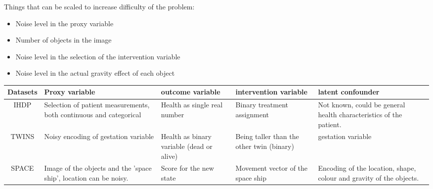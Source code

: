 \documentclass{article}
\begin{document}
Things that can be scaled to increase difficulty of the problem:
\begin{itemize}
    \item Noise level in the proxy variable
    \item Number of objects in the image
    \item Noise level in the selection of the intervention variable
    \item Noise level in the actual gravity effect of each object
\end{itemize}


\begin{table}[]
    \centering
    \begin{tabular}{c|p{4cm}|p{3.5cm}|p{3.5cm}|p{4cm}}
        Datasets & Proxy variable & outcome variable & intervention variable & latent confounder \\
        \hline
        IHDP & Selection of patient measurements, both continuous and categorical & Health as single real number & Binary treatment assignment & Not known, could be general health characteristics of the patient.\\
        \hline
        TWINS & Noisy encoding of gestation variable & Health as binary variable (dead or alive) & Being taller than the other twin (binary) & gestation variable \\ 
        \hline
        SPACE & Image of the objects and the 'space ship', location can be noisy.  & Score for the new state & Movement vector of the space ship & Encoding of the location, shape, colour and gravity of the objects.\\
    \end{tabular}
    \label{tab:my_label}
\end{table}
\end{document}
